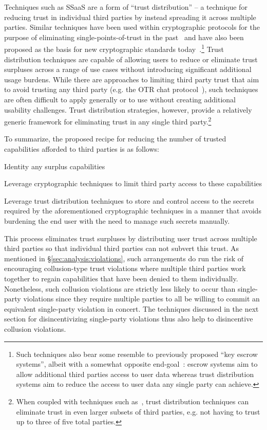Techniques such as SSaaS are a form of ``trust distribution'' -- a
technique for reducing trust in individual third parties by instead
spreading it across multiple parties. Similar techniques have been
used within cryptographic protocols for the purpose of eliminating
single-points-of-trust in the past~\cite{shamir1979} and have also
been proposed as the basis for new cryptographic standards
today~\cite{milagro, nakamoto2008}.\footnote{Such techniques also bear
  some resemble to previously proposed ``key escrow systems'', albeit
  with a somewhat opposite end-goal~\cite{denning1996}: escrow systems
  aim to allow additional third parties access to user data whereas
  trust distribution systems aim to reduce the access to user data any
  single party can achieve.}  Trust distribution techniques are
capable of allowing users to reduce or eliminate trust surpluses
across a range of use cases without introducing significant additional
usage burdens. While there are approaches to limiting third party
trust that aim to avoid trusting any third party (e.g. the OTR chat
protocol~\cite{otr-v3}), such techniques are often difficult to apply
generally or to use without creating additional usability
challenges. Trust distribution strategies, however, provide a
relatively generic framework for eliminating trust in any single third
party.\footnote{When coupled with techniques such
  as~\cite{shamir1979}, trust distribution techniques can eliminate
  trust in even larger subsets of third parties, e.g. not having to
  trust up to three of five total parties.}

To summarize, the proposed recipe for reducing the number of trusted
capabilities afforded to third parties is as follows:

\begin{packed_enum}
\item Identity any surplus capabilities
\item Leverage cryptographic techniques to limit third party access to
  these capabilities
\item Leverage trust distribution techniques to store and control
  access to the secrets required by the aforementioned cryptographic
  techniques in a manner that avoids burdening the end user with the
  need to manage such secrets manually.
\end{packed_enum}

This process eliminates trust surpluses by distributing user trust
across multiple third parties so that individual third parties can not
subvert this trust. As mentioned in \S\ref{sec:analysis:violations},
such arrangements do run the risk of encouraging collusion-type trust
violations where multiple third parties work together to regain
capabilities that have been denied to them individually. Nonetheless,
such collusion violations are strictly less likely to occur than
single-party violations since they require multiple parties to all be
willing to commit an equivalent single-party violation in concert. The
techniques discussed in the next section for disincentivizing
single-party violations thus also help to disincentive collusion
violations.

